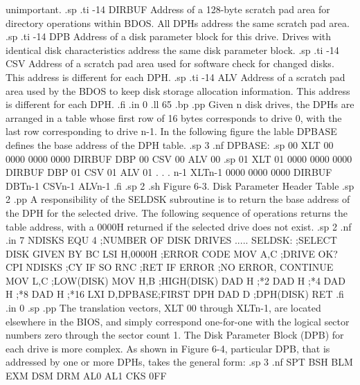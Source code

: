 unimportant.
.sp
.ti -14
DIRBUF        Address of a 128-byte scratch pad area for directory operations
within BDOS.  All DPHs address the same scratch pad area.
.sp
.ti -14
DPB           Address of a disk parameter block for this drive.  Drives with
identical disk characteristics address the same disk parameter block.
.sp
.ti -14
CSV           Address of a scratch pad area used for software check for
changed disks.  This address is different for each DPH.
.sp
.ti -14
ALV           Address of a scratch pad area used by the BDOS to keep disk
storage allocation information.  This address is different for each DPH.
.fi
.in 0
.ll 65
.bp
.pp
Given n disk drives, the DPHs are arranged in a table whose first row of 16
bytes corresponds to drive 0, with the last row corresponding to drive n-1.
In the following figure the lable DPBASE defines the base address of the DPH
table.
.sp 3
.nf
   DPBASE:
.sp
      00  XLT 00  0000  0000  0000  DIRBUF DBP 00 CSV 00 ALV 00
.sp
      01  XLT 01  0000  0000  0000  DIRBUF DBP 01 CSV 01 ALV 01
                                    .
                                    .
                                    .
     n-1  XLTn-1  0000  0000  0000  DIRBUF DBTn-1 CSVn-1 ALVn-1
.fi
.sp 2
.sh
            Figure 6-3.  Disk Parameter Header Table
.sp 2
.pp
A responsibility of the SELDSK subroutine is to return the base address of
the DPH for the selected drive.  The following sequence of operations returns
the table address, with a 0000H returned if the selected drive does not exist.
.sp 2
.nf
.in 7
 NDISKS      EQU     4         ;NUMBER OF DISK DRIVES
 .....
 SELDSK:     ;SELECT DISK GIVEN BY BC
             LSI     H,0000H   ;ERROR CODE
             MOV     A,C       ;DRIVE OK?
             CPI     NDISKS    ;CY IF SO
             RNC               ;RET IF ERROR
             ;NO ERROR, CONTINUE
             MOV     L,C       ;LOW(DISK)
             MOV     H,B       ;HIGH(DISK)
             DAD     H         ;*2
             DAD     H         ;*4
             DAD     H         ;*8
             DAD     H         ;*16
             LXI     D,DPBASE;FIRST DPH
             DAD     D         ;DPH(DISK)
             RET
.fi
.in 0
.sp
.pp
The translation vectors, XLT 00 through XLTn-1, are located elsewhere in
the BIOS, and simply correspond one-for-one with the logical sector numbers
zero through the sector count 1.  The Disk Parameter Block (DPB) for each
drive is more complex.  As shown in Figure 6-4, particular DPB, that is
addressed by one or more DPHs, takes the general form:
.sp 3
.nf
    SPT   BSH   BLM   EXM   DSM   DRM   AL0   AL1   CKS   0FF
